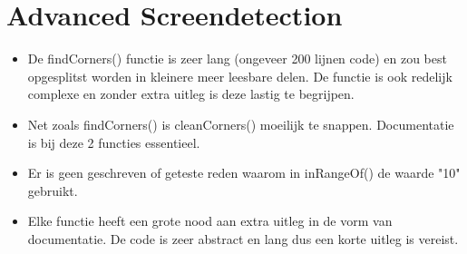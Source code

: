 \documentclass[a4paper,11pt]{article}
\begin{document}
\section{Advanced Screendetection}

\begin{itemize}
\item De findCorners() functie is zeer lang (ongeveer 200 lijnen code) en zou best opgesplitst worden in kleinere meer leesbare delen. De functie is ook redelijk complexe en zonder extra uitleg is deze lastig te begrijpen.
\item Net zoals findCorners() is cleanCorners() moeilijk te snappen. Documentatie is bij deze 2 functies essentieel.
\item Er is geen geschreven of geteste reden waarom in inRangeOf() de waarde "10" gebruikt.
\item Elke functie heeft een grote nood aan extra uitleg in de vorm van documentatie. De code is zeer abstract en lang dus een korte uitleg is vereist. 
\end{itemize}
\end{document}
